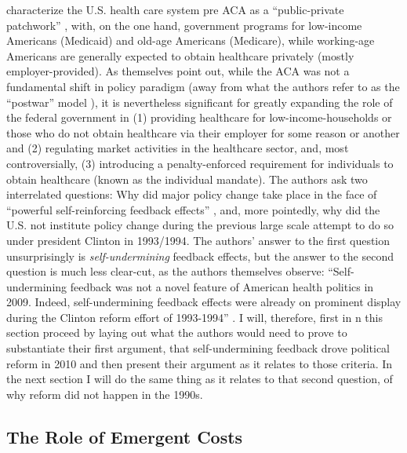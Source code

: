 \documentclass[11pt]{article}
\begin{document}
\textcite[][]{Jacobs2014} characterize the U.S. health care system pre ACA as a \enquote{public-private patchwork} , with, on the one hand, government programs for low-income Americans (Medicaid) and old-age Americans (Medicare), while working-age Americans are generally expected to obtain healthcare privately (mostly employer-provided). As \textcite[][]{Jacobs2014} themselves point out, while the ACA was not a fundamental shift in policy paradigm (away from what the authors refer to as the \enquote{postwar} model ), it is nevertheless significant for greatly expanding the role of the federal government in (1) providing healthcare for low-income-households or those who do not obtain healthcare via their employer for some reason or another and (2) regulating market activities in the healthcare sector, and, most controversially, (3) introducing a penalty-enforced requirement for individuals to obtain healthcare (known as the individual mandate). The authors ask two interrelated questions: Why did major policy change take place in the face of \enquote{powerful self-reinforcing feedback effects} \parencite[][p. 451]{Jacobs2014}, and, more pointedly, why did the U.S. not institute policy change during the previous large scale attempt to do so under president Clinton in 1993/1994. The authors' answer to the first question unsurprisingly is \textit{self-undermining} feedback effects, but the answer to the second question is much less clear-cut, as the authors themselves observe: \enquote{Self-undermining feedback was not a novel feature of American health politics in 2009. Indeed, self-undermining feedback effects were already on prominent display during the Clinton reform effort of 1993-1994} \parencite[][p. 451]{Jacobs2014}. I will, therefore, first in n this section proceed by laying out what the authors would need to prove to substantiate their first argument, that self-undermining feedback drove political reform in 2010 and then present their argument as it relates to those criteria. In the next section I will do the same thing as it relates to that second question, of why reform did not happen in the 1990s.

\subsection*{The Role of Emergent Costs}
\end{document}
